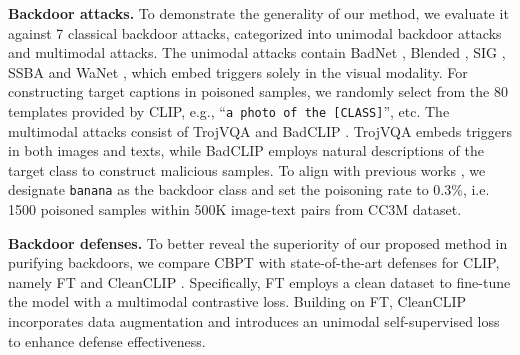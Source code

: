 \textbf{Backdoor attacks.}
To demonstrate the generality of our method, we evaluate it against 7 classical backdoor attacks,  categorized into unimodal backdoor attacks and multimodal attacks. The unimodal attacks contain BadNet \cite{gu2019badnets}, Blended \cite{chen2017targeted}, SIG \cite{barni2019new}, SSBA \cite{li2021invisible} and WaNet \cite{nguyen2021wanet}, which embed triggers solely in the visual modality. For constructing target captions in poisoned samples, we randomly select from the 80 templates provided by CLIP, e.g., “\texttt{a photo of the [CLASS]}”, etc.  The multimodal attacks consist of TrojVQA \cite{walmer2022dual} and BadCLIP \cite{liang2024badclip}. TrojVQA embeds triggers in both images and texts, while BadCLIP employs natural descriptions of the target class to construct malicious samples. To align with previous works \cite{bansal2023cleanclip, liang2024badclip}, we designate \texttt{banana} as the backdoor class and set the poisoning rate to 0.3\%, i.e. 1500 poisoned samples within 500K image-text pairs from CC3M dataset.

\textbf{Backdoor defenses.}
To better reveal the superiority of our proposed method in purifying backdoors, we compare CBPT with state-of-the-art defenses for CLIP, namely FT and CleanCLIP \cite{bansal2023cleanclip}. Specifically, FT employs a clean dataset to fine-tune the model with a multimodal contrastive loss. Building on FT, CleanCLIP incorporates data augmentation and introduces an unimodal self-supervised loss to enhance defense effectiveness.

